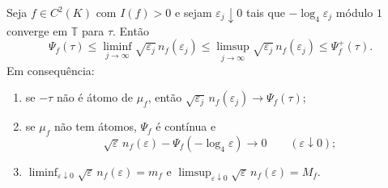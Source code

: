 \begin{theorem}\label{map:artigo_2:12.7}
\label{artigo_2:thm:phase-law}
Seja $f\in C^2(K)$ com $I(f)>0$ e sejam $\varepsilon_j\downarrow0$ tais que
$-\log_4\varepsilon_j$ módulo $1$ converge em $\mathbb T$ para $\tau$. Então
\begin{equation}
 \Psi_f(\tau)\le\liminf_{j\to\infty}\sqrt{\varepsilon_j}\,n_f(\varepsilon_j)
 \le\limsup_{j\to\infty}\sqrt{\varepsilon_j}\,n_f(\varepsilon_j)\le\Psi_f^+(\tau).
 \label{artigo_2:eq:phase-law}
\end{equation}
Em consequência:
\begin{enumerate}[label=(\roman*)]
\item se $-\tau$ não é átomo de $\mu_f$, então
 $\sqrt{\varepsilon_j}\,n_f(\varepsilon_j)\to\Psi_f(\tau)$;
\item se $\mu_f$ não tem átomos, $\Psi_f$ é contínua e
 \[
  \sqrt\varepsilon\,n_f(\varepsilon)-\Psi_f(-\log_4\varepsilon)\to0
  \qquad(\varepsilon\downarrow0);
 \]
\item $\liminf_{\varepsilon\downarrow0}\sqrt\varepsilon\,n_f(\varepsilon)=m_f$ e
 $\limsup_{\varepsilon\downarrow0}\sqrt\varepsilon\,n_f(\varepsilon)=M_f$.
\end{enumerate}
\end{theorem}

